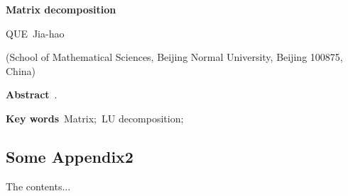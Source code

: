 \documentclass[UTF8, a4paper, 12pt, oneside, onecolumn]{article}
\begin{document}
\begin{center}
{ \bf Matrix decomposition}

{ QUE~Jia-hao}

{ (School of Mathematical Sciences, Beijing Normal University, Beijing 100875, China)}
\end{center}

{ \bf Abstract}~.

{ \bf Key words}~Matrix;~LU decomposition;

\begin{appendices}

\section{\bfseries Some Appendix2}\label{aaa}
The contents...

\end{appendices}
\end{document}
